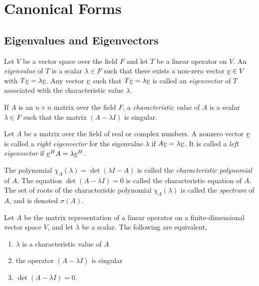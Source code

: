 \chapter{Canonical Forms}

\section{Eigenvalues and Eigenvectors}

\begin{definition}
Let $V$ be a vector space over the field $F$ and let $T$ be a linear operator on $V$.
An \emph{eigenvalue} of $T$ is a scalar $\lambda \in F$ such that there exists a non-zero vector $\underline{v} \in V$ with $T \underline{v} = \lambda \underline{v}$.
Any vector $\underline{v}$ such that $T \underline{v} = \lambda \underline{v}$ is called an \emph{eigenvector} of $T$ associated with the characteristic value $\lambda$.
\end{definition}

\begin{definition}
If $A$ is an $n \times n$ matrix over the field $F$, a \emph{characteristic value} of $A$ is a scalar $\lambda \in F$ such that the matrix $(A - \lambda I)$ is singular.
\end{definition}

Let $A$ be a matrix over the field of real or complex numbers.
A nonzero vector $\underline{v}$ is called a \emph{right eigenvector} for the eigenvalue $\lambda$ if $A \underline{v} = \lambda \underline{v}$.
It is called a \emph{left eigenvector} if $\underline{v}^H A = \lambda \underline{v}^H$.

The polynomial $\chi_A (\lambda) = \det (\lambda I - A)$ is called the \emph{characteristic polynomial} of $A$.
The equation $\det (A - \lambda I) = 0$ is called the characteristic equation of $A$.
The set of roots of the characteristic polynomial $\chi_A (\lambda)$ is called the \emph{spectrum} of $A$, and is denoted $\sigma(A)$.

\begin{fact}
Let $A$ be the matrix representation of a linear operator on a finite-dimensional vector space $V$, and let $\lambda$ be a scalar.
The following are equivalent,
\begin{enumerate}
\item $\lambda$ is a characteristic value of $A$
\item the operator $(A - \lambda I)$ is singular
\item $\det (A - \lambda I) = 0$.
\end{enumerate}
\end{fact}

